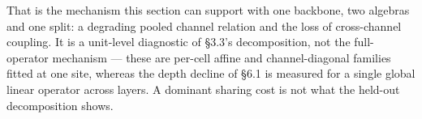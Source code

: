 That is the mechanism this section can support with one backbone, two algebras and one split: a degrading pooled channel relation and the loss of cross-channel coupling. It is a unit-level diagnostic of \S{}3.3's decomposition, not the full-operator mechanism --- these are per-cell affine and channel-diagonal families fitted at one site, whereas the depth decline of \S{}6.1 is measured for a single global linear operator across layers. A dominant sharing cost is not what the held-out decomposition shows.

